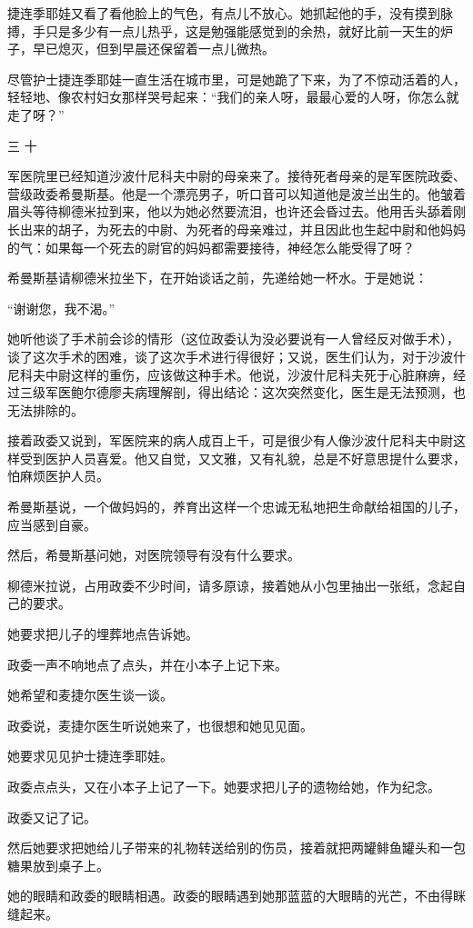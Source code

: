 捷连季耶娃又看了看他脸上的气色，有点儿不放心。她抓起他的手，没有摸到脉搏，手只是多少有一点儿热乎，这是勉强能感觉到的余热，就好比前一天生的炉子，早已熄灭，但到早晨还保留着一点儿微热。

尽管护士捷连季耶娃一直生活在城市里，可是她跪了下来，为了不惊动活着的人，轻轻地、像农村妇女那样哭号起来：“我们的亲人呀，最最心爱的人呀，你怎么就走了呀？”

三 十

军医院里已经知道沙波什尼科夫中尉的母亲来了。接待死者母亲的是军医院政委、营级政委希曼斯基。他是一个漂亮男子，听口音可以知道他是波兰出生的。他皱着眉头等待柳德米拉到来，他以为她必然要流泪，也许还会昏过去。他用舌头舔着刚长出来的胡子，为死去的中尉、为死者的母亲难过，并且因此也生起中尉和他妈妈的气：如果每一个死去的尉官的妈妈都需要接待，神经怎么能受得了呀？

希曼斯基请柳德米拉坐下，在开始谈话之前，先递给她一杯水。于是她说：

“谢谢您，我不渴。”

她听他谈了手术前会诊的情形（这位政委认为没必要说有一人曾经反对做手术），谈了这次手术的困难，谈了这次手术进行得很好；又说，医生们认为，对于沙波什尼科夫中尉这样的重伤，应该做这种手术。他说，沙波什尼科夫死于心脏麻痹，经过三级军医鲍尔德廖夫病理解剖，得出结论：这次突然变化，医生是无法预测，也无法排除的。

接着政委又说到，军医院来的病人成百上千，可是很少有人像沙波什尼科夫中尉这样受到医护人员喜爱。他又自觉，又文雅，又有礼貌，总是不好意思提什么要求，怕麻烦医护人员。

希曼斯基说，一个做妈妈的，养育出这样一个忠诚无私地把生命献给祖国的儿子，应当感到自豪。

然后，希曼斯基问她，对医院领导有没有什么要求。

柳德米拉说，占用政委不少时间，请多原谅，接着她从小包里抽出一张纸，念起自己的要求。

她要求把儿子的埋葬地点告诉她。

政委一声不响地点了点头，并在小本子上记下来。

她希望和麦捷尔医生谈一谈。

政委说，麦捷尔医生听说她来了，也很想和她见见面。

她要求见见护士捷连季耶娃。

政委点点头，又在小本子上记了一下。她要求把儿子的遗物给她，作为纪念。

政委又记了记。

然后她要求把她给儿子带来的礼物转送给别的伤员，接着就把两罐鲱鱼罐头和一包糖果放到桌子上。

她的眼睛和政委的眼睛相遇。政委的眼睛遇到她那蓝蓝的大眼睛的光芒，不由得眯缝起来。

